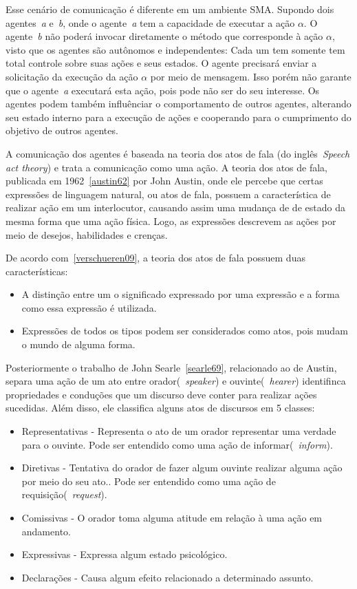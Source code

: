 Esse cenário de comunicação é diferente em um ambiente SMA. Supondo dois agentes~\emph{a} e~\emph{b}, onde o agente~\emph{a} tem a capacidade de executar a ação $\alpha$. O agente~\emph{b} não poderá invocar diretamente o método que corresponde à ação $\alpha$, visto que os agentes são autônomos e independentes: Cada um tem somente tem total controle sobre suas ações e seus estados. O agente precisará enviar a solicitação da execução da ação $\alpha$ por meio de mensagem. Isso porém não garante que o agente~\emph{a} executará esta ação, pois pode não ser do seu interesse. Os agentes podem também influênciar o comportamento de outros agentes, alterando seu estado interno para a execução de ações e cooperando para o cumprimento do objetivo de outros agentes.

A comunicação dos agentes é baseada na teoria dos atos de fala (do inglês~\emph{Speech act theory}) e trata a comunicação como uma ação. A teoria dos atos de fala, publicada em 1962~\ref{austin62} por John Austin, onde ele percebe que certas expressões de linguagem natural, ou atos de fala, possuem a característica de realizar ação em um interlocutor, causando assim uma mudança de de estado da mesma forma que uma ação física. Logo, as expressões descrevem as ações por meio de desejos, habilidades e crenças.

De acordo com~\ref{verschueren09}, a teoria dos atos de fala possuem duas características:
\begin{itemize}
	\item A distinção entre um o significado expressado por uma expressão e a forma como essa expressão é utilizada.
	\item Expressões de todos os tipos podem ser considerados como atos, pois mudam o mundo de alguma forma.
\end{itemize}

Posteriormente o trabalho de John Searle~\ref{searle69}, relacionado ao de Austin, separa uma ação de um ato entre orador(~\emph{speaker}) e ouvinte(~\emph{hearer}) identifinca propriedades e conduções que um discurso deve conter para realizar ações sucedidas. Além disso, ele classifica alguns atos de discursos em 5 classes:
\begin{itemize}
	\item Representativas - Representa o ato de um orador representar uma verdade para o ouvinte. Pode ser entendido como uma ação de informar(~\emph{inform}).
	\item Diretivas - Tentativa do orador de fazer algum ouvinte realizar alguma ação por meio do seu ato.. Pode ser entendido como uma ação de requisição(~\emph{request}).
	\item Comissivas - O orador toma alguma atitude em relação à uma ação em andamento.
	\item Expressivas - Expressa algum estado psicológico.
	\item Declarações - Causa algum efeito relacionado a determinado assunto.
\end{itemize}

